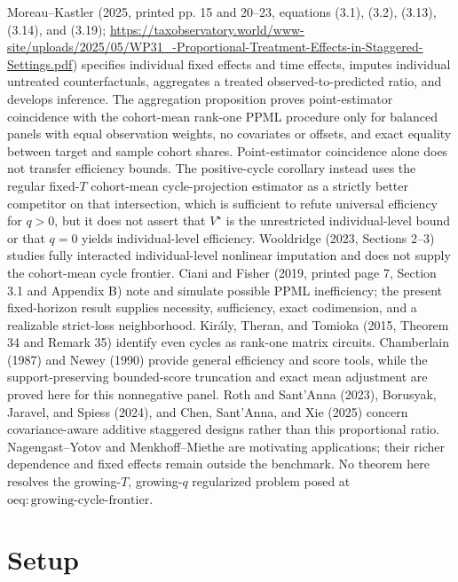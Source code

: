 \documentclass{article}
\begin{document}
Moreau--Kastler (2025, printed pp. 15 and 20--23, equations (3.1), (3.2), (3.13), (3.14), and (3.19); \url{https://taxobservatory.world/www-site/uploads/2025/05/WP31\_-Proportional-Treatment-Effects-in-Staggered-Settings.pdf}) specifies individual fixed effects and time effects, imputes individual untreated counterfactuals, aggregates a treated observed-to-predicted ratio, and develops inference. The aggregation proposition proves point-estimator coincidence with the cohort-mean rank-one PPML procedure only for balanced panels with equal observation weights, no covariates or offsets, and exact equality between target and sample cohort shares. Point-estimator coincidence alone does not transfer efficiency bounds. The positive-cycle corollary instead uses the regular fixed-\(T\) cohort-mean cycle-projection estimator as a strictly better competitor on that intersection, which is sufficient to refute universal efficiency for \(q>0\), but it does not assert that \(V^{\star}\) is the unrestricted individual-level bound or that \(q=0\) yields individual-level efficiency. Wooldridge (2023, Sections 2--3) studies fully interacted individual-level nonlinear imputation and does not supply the cohort-mean cycle frontier. Ciani and Fisher (2019, printed page 7, Section 3.1 and Appendix B) note and simulate possible PPML inefficiency; the present fixed-horizon result supplies necessity, sufficiency, exact codimension, and a realizable strict-loss neighborhood. Kir\'aly, Theran, and Tomioka (2015, Theorem 34 and Remark 35) identify even cycles as rank-one matrix circuits. Chamberlain (1987) and Newey (1990) provide general efficiency and score tools, while the support-preserving bounded-score truncation and exact mean adjustment are proved here for this nonnegative panel. Roth and Sant'Anna (2023), Borusyak, Jaravel, and Spiess (2024), and Chen, Sant'Anna, and Xie (2025) concern covariance-aware additive staggered designs rather than this proportional ratio. Nagengast--Yotov and Menkhoff--Miethe are motivating applications; their richer dependence and fixed effects remain outside the benchmark. No theorem here resolves the growing-\(T\), growing-\(q\) regularized problem posed at \(\mathrm{oeq{:}growing\text{-}cycle\text{-}frontier}\).

\section{Setup}
\end{document}
